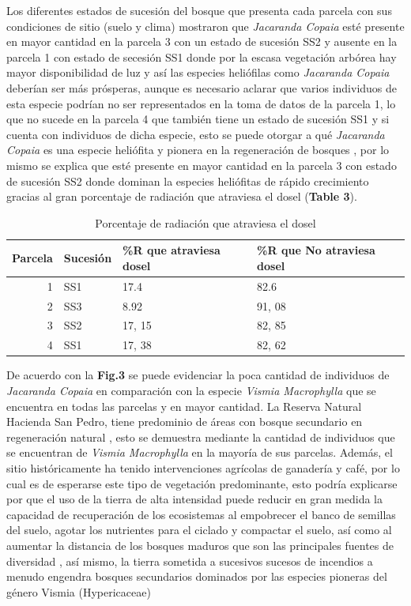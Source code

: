 \documentclass[letterpaper,9pt,onecolumn,twoside,]{pinp}
\begin{document}
Los diferentes estados de sucesión del bosque que presenta cada parcela
con sus condiciones de sitio (suelo y clima) mostraron que \emph{Jacaranda Copaia} esté presente en mayor cantidad en la parcela 3 con un estado
de sucesión SS2 y ausente en la parcela 1 con estado de secesión SS1
donde por la escasa vegetación arbórea hay mayor disponibilidad de luz y
así las especies heliófilas como \emph{Jacaranda Copaia} deberían
ser más prósperas, aunque es necesario aclarar que varios individuos de
esta especie podrían no ser representados en la toma de datos de la
parcela 1, lo que no sucede en la parcela 4 que también tiene un estado
de sucesión SS1 y si cuenta con individuos de dicha especie, esto se
puede otorgar a qué \emph{Jacaranda Copaia} es una especie heliófita y
pionera en la regeneración de bosques \citep{tapia}, por lo mismo se
explica que esté presente en mayor cantidad en la parcela 3 con estado
de sucesión SS2 donde dominan la especies heliófitas de rápido
crecimiento gracias al gran porcentaje de radiación que atraviesa el
dosel (\textbf{Table 3}).

\begin{table}

\caption{\label{tab:unnamed-chunk-7}Porcentaje de radiación que atraviesa el dosel}
\centering
\begin{tabular}[t]{r|l|l|l}
\hline
Parcela & Sucesión & \%R que atraviesa dosel & \%R que No atraviesa dosel\\
\hline
1 & SS1 & 17.4 & 82.6\\
\hline
2 & SS3 & 8.92 & 91, 08\\
\hline
3 & SS2 & 17, 15 & 82, 85\\
\hline
4 & SS1 & 17, 38 & 82, 62\\
\hline
\end{tabular}
\end{table}

De acuerdo con la \textbf{Fig.3} se puede evidenciar la poca cantidad de
individuos de \emph{Jacaranda Copaia} en comparación con la especie
\emph{Vismia Macrophylla} que se encuentra en todas las parcelas y en
mayor cantidad. La Reserva Natural Hacienda San Pedro, tiene
predominio de áreas con bosque secundario en regeneración natural
\citep{sala}, esto se demuestra mediante la cantidad de individuos que se
encuentran de \emph{Vismia Macrophylla} en la mayoría de sus parcelas.
Además, el sitio históricamente ha tenido intervenciones agrícolas de
ganadería y café, por lo cual es de esperarse este tipo de vegetación
predominante, esto podría explicarse por que el uso de la tierra de alta
intensidad puede reducir en gran medida la capacidad de recuperación de
los ecosistemas al empobrecer el banco de semillas del suelo, agotar los
nutrientes para el ciclado y compactar el suelo, así como al aumentar la
distancia de los bosques maduros que son las principales fuentes de
diversidad \citep{grubb, hooper, pic}, así mismo, la tierra sometida a
sucesivos sucesos de incendios a menudo engendra bosques secundarios
dominados por las especies pioneras del género Vismia (Hypericaceae)
\citep{jak}
\end{document}
